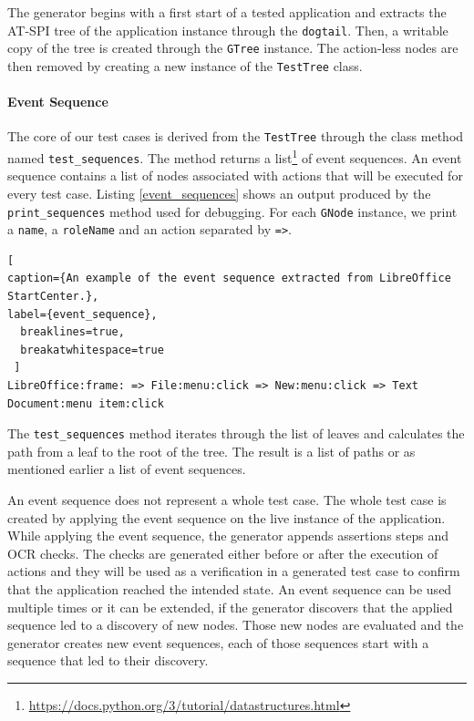 The generator begins with a first start of a tested application and extracts the AT-SPI tree of the application instance through the \texttt{dogtail}. Then, a writable copy of the tree is created through the \texttt{GTree} instance. The action-less nodes are then removed by creating a new instance of the \texttt{TestTree} class. 


\paragraph{Event Sequence} The core of our test cases is derived from the \texttt{TestTree} through the class method named \texttt{test\_sequences}. The method returns a list\footnote{\url{https://docs.python.org/3/tutorial/datastructures.html}} of event sequences. An event sequence contains a list of nodes associated with actions that will be executed for every test case. Listing \ref{event_sequences} shows an output produced by the \texttt{print\_sequences} method used for debugging. For each \texttt{GNode} instance, we print a \texttt{name}, a \texttt{roleName} and an {action} separated by \texttt{=>}. 

\begin{lstlisting}[
caption={An example of the event sequence extracted from LibreOffice StartCenter.},
label={event_sequence},
  breaklines=true,
  breakatwhitespace=true
 ]
LibreOffice:frame: => File:menu:click => New:menu:click => Text Document:menu item:click
\end{lstlisting}

The \texttt{test\_sequences} method iterates through the list of leaves and calculates the path from a leaf to the root of the tree. The result is a list of paths or as mentioned earlier a list of event sequences.

An event sequence does not represent a whole test case. The whole test case is created by applying the event sequence on the live instance of the application. While applying the event sequence, the generator appends assertions steps and OCR checks. The checks are generated either before or after the execution of actions and they will be used as a verification in a generated test case to confirm that the application reached the intended state. An event sequence can be used multiple times or it can be extended, if the generator discovers that the applied sequence led to a discovery of new nodes. Those new nodes are evaluated and the generator creates new event sequences, each of those sequences start with a sequence that led to their discovery. 



